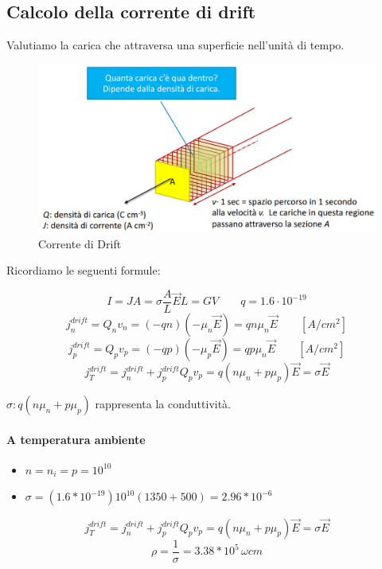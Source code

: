 \newpage
\subsection{Calcolo della corrente di drift}
Valutiamo	la	carica	che	attraversa	una	superficie	nell'unità	di	tempo.


\begin{figure}[htbp]
    \centering
    \includegraphics[width=0.9\linewidth]{img/carica_drift.png}
    \caption{Corrente di Drift}    
\end{figure}

Ricordiamo le seguenti formule:

\begin{equation*}
    I = JA = \sigma \frac{A}{L}\vec{E}L = GV \quad\quad q = 1.6\cdot10^{-19}
\end{equation*}
\begin{equation}
    j_n^{drift} = Q_nv_n = (-qn)(-\mu_n\vec{E}) = qn\mu_n\vec{E} \qquad[A/cm^2]
\end{equation}
\begin{equation}
    j_p^{drift} = Q_pv_p = (-qp)(-\mu_p\vec{E}) = qp\mu_n\vec{E} \qquad[A/cm^2]
\end{equation}
\begin{equation}
    j_T^{drift} = j_n^{drift} + j_p^{drift}Q_pv_p = q(n\mu_n + p\mu_p)\vec{E} = \sigma \vec{E}
\end{equation}

$\sigma: q(n\mu_n + p\mu_p)$ rappresenta la conduttività.

\paragraph{A temperatura ambiente}

\begin{itemize}
    \item[] $n = n_i = p = 10^{10}$
    \item[] $\sigma = (1.6*10^{-19})10^{10}(1350+500) = 2.96*10^{-6}$
\end{itemize}
\begin{equation*}
    j_T^{drift} = j_n^{drift} + j_p^{drift}Q_pv_p = q(n\mu_n + p\mu_p)\vec{E} = \sigma \vec{E}
\end{equation*}
\begin{equation*}
    \rho = \frac{1}{\sigma} = 3.38*10^{5}\, \omega cm
\end{equation*}

